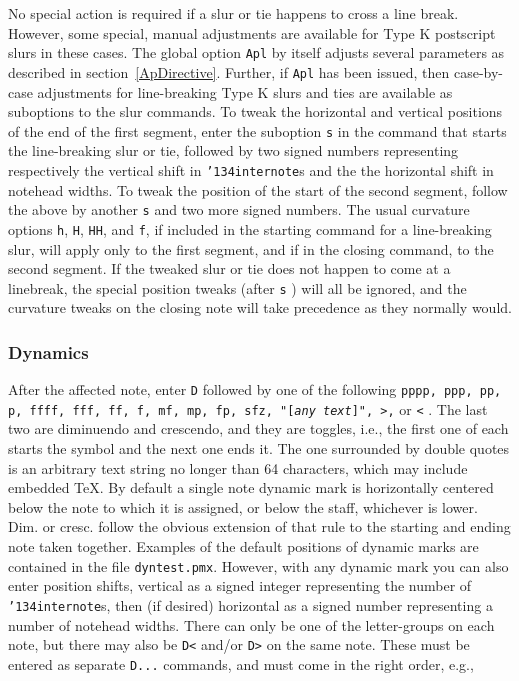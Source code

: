 \documentclass[11pt]{article}
\def\bs{{\tt\char'134}}
\def\newfrom{2.59}  %
\def\NEW#1{\ifdim#1 pt<\newfrom pt\else%
\marginpar{\fbox{#1}}\fi}
\begin{document}
No special action is required if a slur or tie happens to cross a line break.
However, some special, manual adjustments are available for Type K postscript
slurs in these cases. The global option {\tt Apl} by itself adjusts several 
parameters as described in section~\ref{ApDirective}. Further, if {\tt Apl} 
has been issued, 
then case-by-case adjustments for line-breaking Type K slurs and ties are 
available as suboptions to the
slur commands. To tweak the horizontal and vertical positions of the end of 
the first segment, enter the suboption {\tt s} in the command that starts 
the line-breaking slur or tie, followed by two signed numbers representing 
respectively the vertical shift 
in \bs{\tt internote}s and the the horizontal shift in notehead widths. To
tweak the position of the start of the second segment, follow the above by 
another {\tt s} and two more signed numbers. The usual curvature options 
{\tt h}, {\tt H}, {\tt HH}, and {\tt f}, if included in
the starting command for a line-breaking slur, will apply only to the first
segment, and if in the closing command, to the second segment. If the tweaked 
slur or tie does not happen to come at a linebreak,
the special position tweaks (after {\tt s} ) will all be ignored, and the 
curvature tweaks on the closing note will take precedence as they normally 
would.

\subsubsection{Dynamics} \label{dynamics}

\NEW{2.3}
After the affected note, enter {\tt D} followed by one of the 
following {\tt pppp, ppp, pp, p, ffff, fff, ff, f, mf, mp, fp, sfz,
"[{\it any text}]", >,}
or {\tt <} .  The last two are diminuendo and crescendo, and they are toggles, 
i.e., the first one of each starts the symbol and the next one ends it.  
The one surrounded by \NEW{2.76} double quotes is an arbitrary text string
no longer than 64 characters, which may include embedded \TeX.
By default a single note dynamic mark is horizontally centered below the note 
to which it is assigned, or below the staff, whichever is lower. Dim. or cresc.
follow the obvious extension of that rule to the starting and ending note taken
together. Examples of the default positions of dynamic marks are contained 
in the file {\tt dyntest.pmx}. However, with any dynamic mark you can also 
enter position shifts, vertical as a signed integer representing
the number of {\tt \bs internote}s, then (if desired) horizontal as a signed 
number representing a 
number of notehead widths.  There can only be one of the letter-groups on each 
note, but there may also be {\tt D<} and/or {\tt D>} on the same note.  These must be 
entered as separate {\tt D...} commands, and must come in the right order, e.g.,
\end{document}

